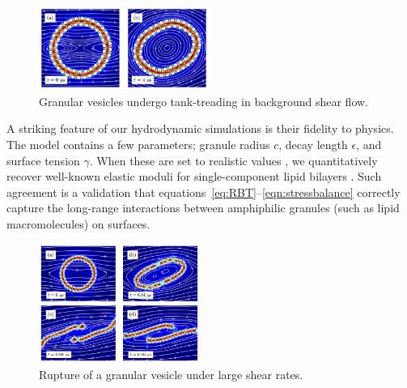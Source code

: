 \begin{figure}
\vspace{-5pt}
\includegraphics[width=0.5\textwidth]{figures/PreliminaryWork/TankTreading.jpg}
\vspace{-20pt}
\caption{\label{fig:JPv_linearshear} \footnotesize Granular vesicles
  undergo tank-treading in background shear flow.}
\end{figure}
%
A striking feature of our hydrodynamic simulations is their fidelity to
physics. The model contains a few parameters; granule radius $c$, decay
length $\epsilon$, and surface tension $\gamma$. When these are set to
realistic values \cite{Fu2018_SIAM, ErLjCl89, Lin2005, Parsegian,
Israelachvili80, GarciaSaez, KUZMIN2005, Petelska2012,Jackson2016}, we
quantitatively recover well-known elastic moduli for
single-component lipid bilayers \cite{Nagle17, Nagle17-2,
LeVeWa14,NAGLE2000159}. Such agreement is a validation that
equations~\eqref{eq:RBT}--\eqref{eqn:stressbalance} correctly capture
the long-range interactions between amphiphilic granules (such as lipid
macromolecules) on surfaces.
\begin{figure}
\vspace{-0pt}
\includegraphics[width=0.475\textwidth]{figures/PreliminaryWork/Rupture.jpg}
\vspace{-25pt}
\caption{\label{fig:JPv_rupture} \footnotesize Rupture of a granular
  vesicle under large shear rates.}
\end{figure}

